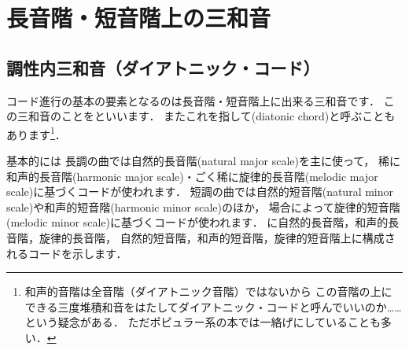 \documentclass[dvipdfmx,uplatex,b5paper,openany,jbase=12Q,nomag*,textwidth-limit=44%
               ]{gachimuchi}[2020/05/05]
\begin{document}
\chapter{長音階・短音階上の三和音}
\section{調性内三和音（ダイアトニック・コード）}
コード進行の基本の要素となるのは長音階・短音階上に出来る三和音です．
この三和音のことをといいます\cite[p.23]{ptSHIMIZU1}．
またこれを指して\xkanjispace(diatonic chord)と呼ぶこともあります\footnote{
  和声的音階は全音階（ダイアトニック音階）ではないから
  この音階の上にできる三度堆積和音をはたしてダイアトニック・コードと呼んでいいのか……という疑念がある．
  ただポピュラー系の本では一絡げにしていることも多い．
}．

基本的には
長調の曲では自然的長音階(natural major scale)を主に使って，
稀に和声的長音階(harmonic major scale)・ごく稀に旋律的長音階(melodic major scale)に基づくコードが使われます．
短調の曲では自然的短音階(natural minor scale)や和声的短音階(harmonic minor scale)のほか，
場合によって旋律的短音階(melodic minor scale)に基づくコードが使われます．
に自然的長音階，和声的長音階，旋律的長音階，
自然的短音階，和声的短音階，旋律的短音階上に構成されるコードを示します．
\end{document}
